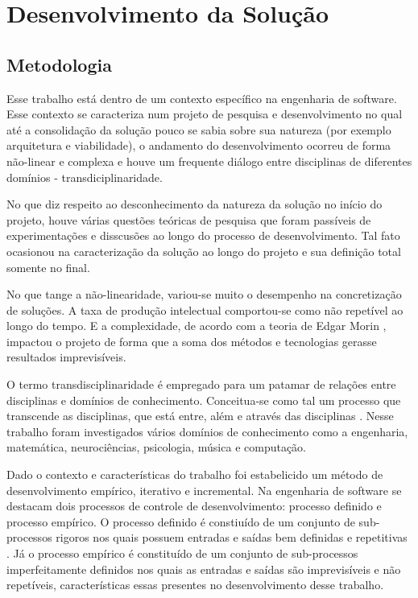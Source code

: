 \chapter{Desenvolvimento da Solução}
\label{chap:solucaocompleta}

\section{Metodologia}

Esse trabalho está dentro de um contexto específico na engenharia de software. Esse contexto se caracteriza num projeto de pesquisa e desenvolvimento no qual até a consolidação da solução pouco se sabia sobre sua natureza (por exemplo arquitetura e viabilidade), o andamento do desenvolvimento ocorreu de forma não-linear e complexa e houve um frequente diálogo entre disciplinas de diferentes domínios - transdiciplinaridade.

No que diz respeito ao desconhecimento da natureza da solução no início do projeto, houve várias questões teóricas de pesquisa que foram passíveis de experimentações e disscusões ao longo do processo de desenvolvimento. Tal fato ocasionou na caracterização da solução ao longo do projeto e sua definição total somente no final.

No que tange a não-linearidade, variou-se muito o desempenho na concretização de soluções. A taxa de produção intelectual comportou-se como não repetível ao longo do tempo. E a complexidade, de acordo com a teoria de Edgar Morin \cite{morin}, impactou o projeto de forma que a soma dos métodos e tecnologias gerasse resultados imprevisíveis.

O termo transdisciplinaridade é empregado para um patamar de relações entre disciplinas e domínios de conhecimento. Conceitua-se como tal um processo que transcende as disciplinas, que está entre, além e através das disciplinas \cite{criatividade}. Nesse trabalho foram investigados vários domínios de conhecimento como a engenharia, matemática, neurociências, psicologia, música e computação.

Dado o contexto e características do trabalho foi estabelicido um método de desenvolvimento empírico, iterativo e incremental. Na engenharia de software se destacam dois processos de controle de desenvolvimento: processo definido e processo empírico. O processo definido é constiuído de um conjunto de sub-processos rigoros nos quais possuem entradas e saídas bem definidas e repetitivas \cite{rup}. Já o processo empírico é constituído de um conjunto de sub-processos imperfeitamente definidos nos quais as entradas e saídas são imprevisíveis e não repetíveis, características essas presentes no desenvolvimento desse trabalho.

